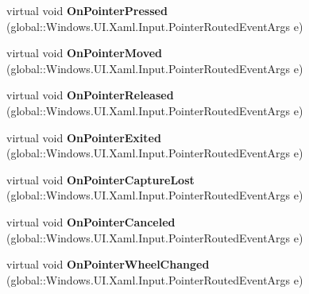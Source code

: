\begin{DoxyCompactItemize}
virtual void {\bfseries On\+Pointer\+Pressed} (global\+::\+Windows.\+U\+I.\+Xaml.\+Input.\+Pointer\+Routed\+Event\+Args e)
\item 
\mbox{\label{class_windows_1_1_u_i_1_1_xaml_1_1_controls_1_1_control_ae671c763ce297220751cee1945c9265b}} 
virtual void {\bfseries On\+Pointer\+Moved} (global\+::\+Windows.\+U\+I.\+Xaml.\+Input.\+Pointer\+Routed\+Event\+Args e)
\item 
\mbox{\label{class_windows_1_1_u_i_1_1_xaml_1_1_controls_1_1_control_a1a16d49c087d495de68e1f9953a4ebfd}} 
virtual void {\bfseries On\+Pointer\+Released} (global\+::\+Windows.\+U\+I.\+Xaml.\+Input.\+Pointer\+Routed\+Event\+Args e)
\item 
\mbox{\label{class_windows_1_1_u_i_1_1_xaml_1_1_controls_1_1_control_a57ecaf6968ada920336dd8afd70ad576}} 
virtual void {\bfseries On\+Pointer\+Exited} (global\+::\+Windows.\+U\+I.\+Xaml.\+Input.\+Pointer\+Routed\+Event\+Args e)
\item 
\mbox{\label{class_windows_1_1_u_i_1_1_xaml_1_1_controls_1_1_control_a2f9ad5125fbed9d126ebcfd2b0fe794c}} 
virtual void {\bfseries On\+Pointer\+Capture\+Lost} (global\+::\+Windows.\+U\+I.\+Xaml.\+Input.\+Pointer\+Routed\+Event\+Args e)
\item 
\mbox{\label{class_windows_1_1_u_i_1_1_xaml_1_1_controls_1_1_control_a94fec4012722a7b1310cbc30233b7940}} 
virtual void {\bfseries On\+Pointer\+Canceled} (global\+::\+Windows.\+U\+I.\+Xaml.\+Input.\+Pointer\+Routed\+Event\+Args e)
\item 
\mbox{\label{class_windows_1_1_u_i_1_1_xaml_1_1_controls_1_1_control_a05f4eb2e6e829dbc04ce27f21650e77d}} 
virtual void {\bfseries On\+Pointer\+Wheel\+Changed} (global\+::\+Windows.\+U\+I.\+Xaml.\+Input.\+Pointer\+Routed\+Event\+Args e)
\item 
\mbox{\label{class_windows_1_1_u_i_1_1_xaml_1_1_controls_1_1_control_a520b4f7b836bf087965e32998fd5898e}} 

\end{DoxyCompactItemize}
